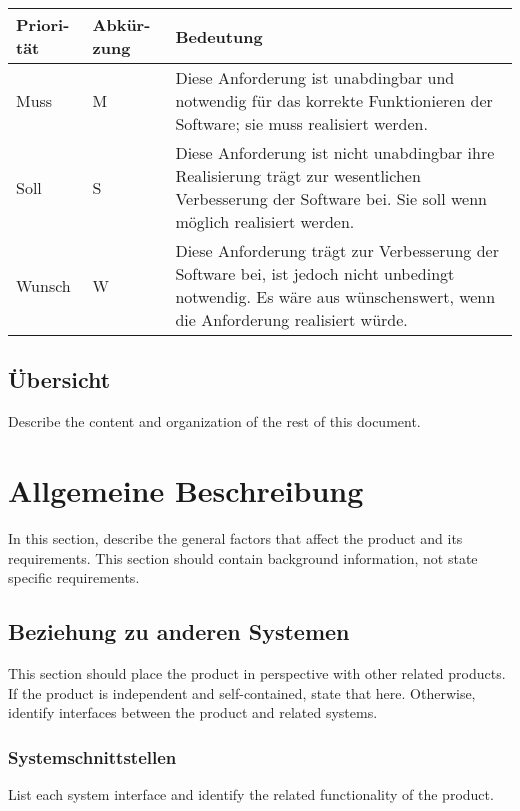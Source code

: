 \begin{tabular}{| p{1.5cm} | p{2cm} | p{10cm} |}

\hline
\textbf{Priori-} \newline \textbf{tät} & 
\textbf{Abkür-} \newline \textbf{zung} & 
\textbf{Bedeutung} \\
\hline

Muss & 
M & 
Diese Anforderung ist unabdingbar und notwendig für das korrekte Funktionieren der Software; sie muss realisiert werden. \\
\hline

Soll &
S &
Diese Anforderung ist nicht unabdingbar ihre Realisierung trägt zur wesentlichen Verbesserung der Software bei. Sie soll wenn möglich realisiert werden. \\
\hline

Wunsch &
W &
Diese Anforderung trägt zur Verbesserung der Software bei, ist jedoch nicht unbedingt notwendig. Es wäre aus wünschenswert, wenn die Anforderung realisiert würde. \\
\hline

\end{tabular}

\subsection{Übersicht}
Describe the content and organization of the rest of this document.

\newpage

\section{Allgemeine Beschreibung}
In this section, describe the general factors that affect the product and its requirements. This section should contain background information, not state specific requirements.

\subsection{Beziehung zu anderen Systemen}
This section should place the product in perspective with other related products. If the product is independent and self-contained, state that here. Otherwise, identify interfaces between the product and related systems.

\subsubsection{Systemschnittstellen}
List each system interface and identify the related functionality of the product.

